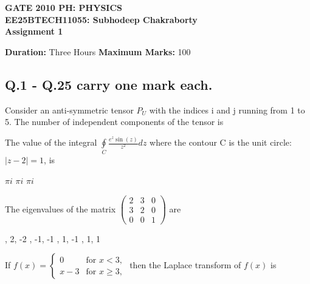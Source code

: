 \documentclass{exam}
\begin{document}
\begin{center}
	\textbf{GATE 2010 PH: PHYSICS} \\
	\textbf{EE25BTECH11055: Subhodeep Chakraborty} \\
	\textbf{Assignment 1}
\end{center}

\noindent\textbf{Duration:} Three Hours \hfill \textbf{Maximum Marks:} 100

\hrulefill

\subsection*{Q.1 - Q.25 carry one mark each.}

\begin{questions}
\question Consider an anti-symmetric tensor $P_{U}$ with the indices i and j running from 1 to 5. The number of independent components of the tensor is \hfill{}


\begin{oneparchoices}
	   
\end{oneparchoices}

\question The value of the integral $\oint\limits_{C}\frac{e^{z}\sin(z)}{z^{2}}dz$ where the contour C is the unit circle: $|z-2|=1$, is\hfill{}


\begin{oneparchoices}
	$\pi i$ $\pi i$ \choice $\pi i$ 
\end{oneparchoices}

\question The eigenvalues of the matrix $\begin{pmatrix} 2 & 3 & 0 \\ 3 & 2 & 0 \\ 0 & 0 & 1 \end{pmatrix}$ are\hfill{}


\begin{oneparchoices}
	, 2, -2 , -1, -1 , 1, -1 , 1, 1
\end{oneparchoices}

\question If $f(x)=\begin{cases}0& \text{for } x<3, \\ x-3& \text{for } x\ge3, \end{cases}$ then the Laplace transform of $f(x)$ is\hfill{}


\end{questions}
\end{document}
